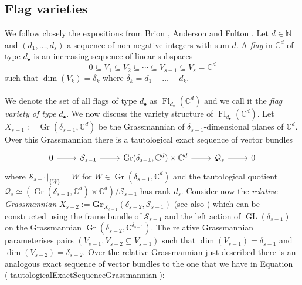 \documentclass{amsart}
\theoremstyle{plain}
\numberwithin{equation}{section}
\theoremstyle{definition}
\theoremstyle{remark}
\begin{document}
	\subsection{Flag varieties}\label{flagVarietiesSection} We follow closely the expositions from Brion \cite[Section 1.2]{BrionFlagVarieties}, Anderson and Fulton \cite[Section 4.2]{AndersonFultonEquivariantCohomology}. Let $d\in \mathbb{N}$ and $(d_1,\ldots,d_s)$ a sequence of non-negative integers with sum $d$. A \emph{flag} in $\mathbb{C}^d$ of type $d_\bullet$ is an increasing sequence of linear subspaces 
	$$
	0\subseteq V_1\subseteq V_2\subseteq \cdots\subseteq V_{s-1}\subseteq V_s=\mathbb{C}^d
	$$
	such that $\dim(V_k)=\delta_k$ where $\delta_k=d_1+\ldots+d_k$. 
	\\
	\\
	We denote the set of all flags of type $d_\bullet$ as  $\operatorname{Fl}_{d_\bullet}(\mathbb{C}^d)$ and we call it the \emph{flag variety of type }$d_\bullet$. We now discuss the variety structure of $\operatorname{Fl}_{d_\bullet}(\mathbb{C}^d)$. Let $X_{s-1}:=\operatorname{Gr}(\delta_{s-1},\mathbb{C}^d)$ be the Grassmannian of $\delta_{s-1}$-dimensional planes of $\mathbb{C}^d$. Over this Grassmannian there is a tautological exact sequence of vector bundles 
	\begin{equation}\label{tautologicalExactSequenceGrassmannian}
		\begin{tikzcd}[column sep =normal, row sep =normal]
			0\arrow[r]&\mathcal{S}_{s-1}\arrow[r]&\operatorname{Gr}(\delta_{s-1},\mathbb{C}^d)\times \mathbb{C}^d \arrow[r]&\mathcal{Q}_s\arrow[r]&0
		\end{tikzcd}
	\end{equation}
	where $\mathcal{S}_{s-1}|_{\{W\}}=W$ for $W\in \operatorname{Gr}(\delta_{s-1},\mathbb{C}^d)$ and the tautological quotient $\mathcal{Q}_s\simeq (\operatorname{Gr}(\delta_{s-1},\mathbb{C}^d)\times \mathbb{C}^d)/\mathcal{S}_{s-1}$ has rank $d_s$. Consider now the \emph{relative Grassmannian} $X_{s-2}:=\mathbf{Gr}_{X_{s-1}}(\delta_{s-2},\mathcal{S}_{s-1})$ (see also \cite[Section 5.1.5]{NitsureHilbertQuotSchemes}) which can be constructed using the frame bundle of $\mathcal{S}_{s-1}$ and the left action of $\operatorname{GL}(\delta_{s-1})$ on the Grassmannian $\operatorname{Gr}(\delta_{s-2},\mathbb{C}^{\delta_{s-1}})$. The relative Grassmannian parameterises pairs $(V_{s-1},V_{s-2}\subseteq V_{s-1})$ such that $\dim(V_{s-1})=\delta_{s-1}$ and $\dim(V_{s-2})=\delta_{s-2}$.  Over the relative Grassmannian just described there is an analogous exact sequence of vector bundles to the one that we have in Equation (\ref{tautologicalExactSequenceGrassmannian}):
\end{document}

